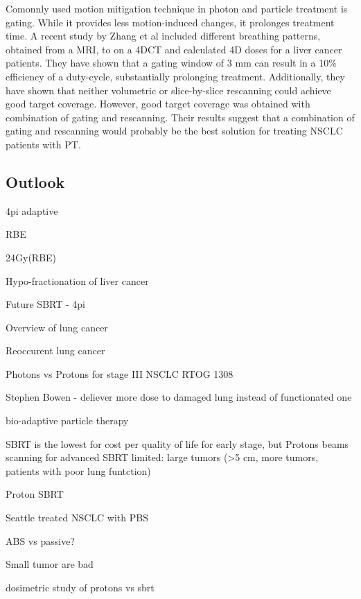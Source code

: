 \documentclass[type=dr, dr=rernat, accentcolor=tud7b,colorbacktitle, bigchapter, openright, twoside, 12pt ]{tudthesis}
\begin{document}
Comonnly used motion mitigation technique in photon and particle treatment is gating. While it provides less motion-induced changes, it prolonges treatment time. A recent study by Zhang et al \cite{Zhang2015} included 
different breathing patterns, obtained from a MRI, to on a 4DCT and calculated 4D doses for a liver cancer patients. They have shown that a gating window of 3 mm can result in a 10\% efficiency of a duty-cycle, 
substantially prolonging treatment. Additionally, they have shown that neither volumetric or slice-by-slice rescanning could achieve good target coverage. However, good target coverage was obtained with combination
of gating and rescanning. Their results suggest that a combination of gating and rescanning would probably be the best solution for treating NSCLC patients with PT. 





\subsection{Outlook}


4pi
adaptive




RBE

24Gy(RBE) %

Hypo-fractionation of liver cancer %

Future SBRT - 4pi %


Overview of lung cancer %

Reoccurent lung cancer %


Photons vs Protons for stage III NSCLC RTOG 1308

Stephen Bowen - deliever more dose to damaged lung instead of functionated one

bio-adaptive particle therapy

SBRT is the lowest for cost per quality of life for early stage, but Protons beams scanning for advanced %
SBRT limited: large tumors (>5 cm, more tumors, patients with poor lung funtction)

Proton SBRT %

Seattle treated NSCLC with PBS

ABS vs passive?

Small tumor are bad %

dosimetric study of protons vs sbrt %


{}
% 
\end{document}
